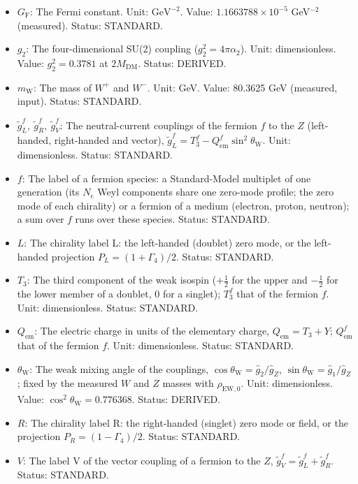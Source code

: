 \documentclass[
  10pt,
]{article}
\providecommand{\tightlist}{%
  \setlength{\itemsep}{0pt}\setlength{\parskip}{0pt}}
\begin{document}
\begin{itemize}
\tightlist
\item
  \(G_{\mathrm{F}}\): The Fermi constant. Unit: \(\mathrm{GeV}^{-2}\).
  Value: \(1.1663788\times10^{-5}\) GeV\(^{-2}\) (measured). Status:
  STANDARD.
\item
  \(g_2\): The four-dimensional SU(2) coupling
  (\(g_2^2 = 4\pi\alpha_2\)). Unit: dimensionless. Value:
  \(g_2^2 = 0.3781\) at \(2M_{\mathrm{DM}}\). Status: DERIVED.
\item
  \(m_{\mathrm{W}}\): The mass of \(W^+\) and \(W^-\). Unit: GeV. Value:
  80.3625 GeV (measured, input). Status: STANDARD.
\item
  \(\tilde g^f_L,\ \tilde g^f_R,\ \tilde g^f_V\): The neutral-current
  couplings of the fermion \(f\) to the \(Z\) (left-handed, right-handed
  and vector),
  \(\tilde g^f_L = T_3^f - Q^f_{\mathrm{em}}\sin^2\theta_{\mathrm{W}}\).
  Unit: dimensionless. Status: STANDARD.
\item
  \(f\): The label of a fermion species: a Standard-Model multiplet of
  one generation (its \(N_{\mathrm{c}}\) Weyl components share one
  zero-mode profile; the zero mode of each chirality) or a fermion of a
  medium (electron, proton, neutron); a sum over \(f\) runs over these
  species. Status: STANDARD.
\item
  \(L\): The chirality label L: the left-handed (doublet) zero mode, or
  the left-handed projection \(P_L = (1 + \Gamma_4)/2\). Status:
  STANDARD.
\item
  \(T_3\): The third component of the weak isospin (\(+\frac12\) for the
  upper and \(-\frac12\) for the lower member of a doublet, 0 for a
  singlet); \(T_3^f\) that of the fermion \(f\). Unit: dimensionless.
  Status: STANDARD.
\item
  \(Q_{\mathrm{em}}\): The electric charge in units of the elementary
  charge, \(Q_{\mathrm{em}} = T_3 + Y\); \(Q^f_{\mathrm{em}}\) that of
  the fermion \(f\). Unit: dimensionless. Status: STANDARD.
\item
  \(\theta_{\mathrm{W}}\): The weak mixing angle of the couplings,
  \(\cos\theta_{\mathrm{W}} = \hat g_2/\hat g_Z\),
  \(\sin\theta_{\mathrm{W}} = \hat g_1/\hat g_Z\); fixed by the measured
  \(W\) and \(Z\) masses with \(\rho_{\mathrm{EW},0}\). Unit:
  dimensionless. Value: \(\cos^2\theta_{\mathrm{W}} = 0.776368\).
  Status: DERIVED.
\item
  \(R\): The chirality label R: the right-handed (singlet) zero mode or
  field, or the projection \(P_R = (1 - \Gamma_4)/2\). Status: STANDARD.
\item
  \(V\): The label V of the vector coupling of a fermion to the \(Z\),
  \(\tilde g^f_V = \tilde g^f_L + \tilde g^f_R\). Status: STANDARD.
\end{itemize}
\end{document}
